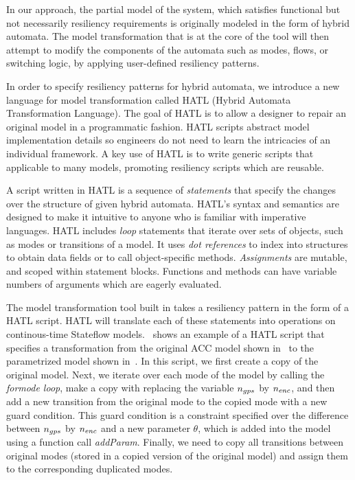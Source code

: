In our approach, the partial model of the system, which satisfies functional but not necessarily resiliency requirements is originally modeled in the form of hybrid automata. The model transformation that is at the core of the \toolreaffirm tool will then attempt to modify the components of the automata such as modes, flows, or switching logic, by applying user-defined resiliency patterns.


In order to specify resiliency patterns for hybrid automata, we introduce a new language for model transformation called HATL (Hybrid Automata Transformation Language). The goal of HATL is to allow a
designer to repair an original model in a programmatic fashion. HATL scripts abstract model implementation details so engineers do not need to learn the intricacies of an individual framework. A key use of HATL is to write generic scripts that applicable to many models, promoting resiliency scripts which are reusable.

A script written in HATL is a sequence of \emph{statements} that specify the changes over the structure of given hybrid automata. HATL's syntax and semantics are designed to make it intuitive to anyone who is familiar with imperative languages. HATL includes \emph{loop} statements that iterate over sets of objects, such as modes or transitions of a model. It uses \emph{dot references} to index into structures to obtain data fields or to call object-specific methods. \emph{Assignments} are mutable, and scoped within statement blocks. Functions and methods can have variable
numbers of arguments which are eagerly evaluated.

The model transformation tool built in \toolreaffirm takes a resiliency pattern in the form of a HATL script. HATL will translate each of these statements into operations on continous-time Stateflow
models.~ shows an example of a HATL script that specifies a transformation from the original ACC model shown in~ to the parametrized model shown in~. 
In this script, we first create a copy of the original model. Next, we iterate over each mode of the model by calling the \emph{formode loop}, make a copy with replacing the variable $n_{gps}$ by $n_{enc}$, and then add a new transition from the original mode to the copied mode with a new guard condition. This guard condition is a constraint specified over the difference between $n_{gps}$ by $n_{enc}$ and a new parameter $\theta$, which is added into the model using a function call \emph{addParam}. 
Finally, we need to copy all transitions between original modes (stored in a copied version of the original model) and assign them to the corresponding duplicated modes.

